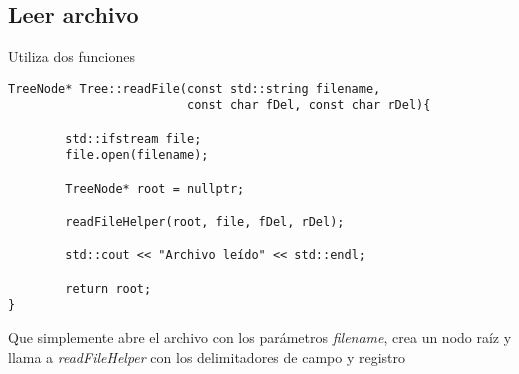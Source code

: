 \documentclass[11pt]{article}
\begin{document}
\subsection{Leer archivo}
\label{sec:org34e97cd}
Utiliza dos funciones
\begin{verbatim}
TreeNode* Tree::readFile(const std::string filename,
                         const char fDel, const char rDel){

        std::ifstream file;
        file.open(filename);

        TreeNode* root = nullptr;

        readFileHelper(root, file, fDel, rDel);

        std::cout << "Archivo leído" << std::endl;

        return root;
}
\end{verbatim}
Que simplemente abre el archivo con los parámetros
\emph{filename}, crea un nodo raíz y llama a
\emph{readFileHelper} con los delimitadores de campo y registro
\end{document}
